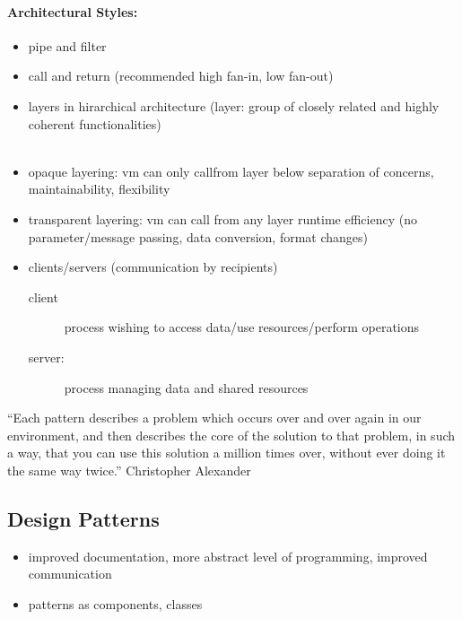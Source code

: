\documentclass[a4paper, 10pt]{article}
\begin{document}
\paragraph{Architectural Styles:}
\begin{itemize}
	\item pipe and filter \\ 
	\item call and return (recommended high fan-in, low fan-out) \\ 
	\item layers in hirarchical architecture (layer: group of closely related and highly coherent functionalities) \\  \\ 
	\item opaque layering: vm can only callfrom layer below \follows separation of concerns, maintainability, flexibility
	\item transparent layering: vm can call from any layer \follows runtime efficiency (no parameter/message passing, data conversion, format changes)
	\item clients/servers (communication by recipients)
	\begin{description}
		\item[client] process wishing to access data/use resources/perform operations
		\item[server:] process managing data and shared resources
	\end{description}
\end{itemize}
\begin{shaded}
``Each pattern describes a problem which occurs over and over again in our environment, and then describes the core of the solution to that problem, in such a way, that you can use this solution a million times over, without ever doing it the same way twice.'' Christopher Alexander
\end{shaded}
\subsection*{Design Patterns}
\begin{itemize}
	\item improved documentation, more abstract level of programming, improved communication
	\item patterns as components, classes
\end{itemize}
\end{document}
